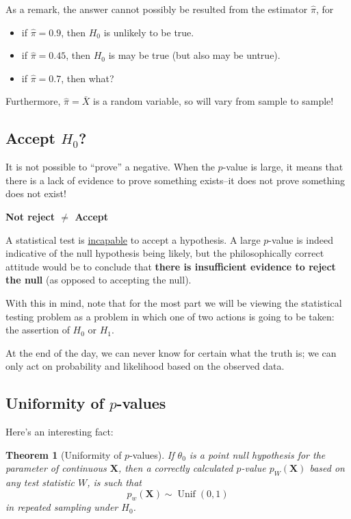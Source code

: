 \documentclass[
]{book}
\providecommand{\tightlist}{%
  \setlength{\itemsep}{0pt}\setlength{\parskip}{0pt}}
\newcommand{\bX}{{\boldsymbol X}}
\DeclareMathOperator{\Unif}{Unif}
\newtheorem{theorem}{Theorem}[chapter]
\theoremstyle{definition}
\theoremstyle{definition}
\theoremstyle{definition}
\theoremstyle{definition}
\theoremstyle{remark}
\begin{document}
As a remark, the answer cannot possibly be resulted from the estimator \(\hat\pi\), for

\begin{itemize}
\tightlist
\item
  if \(\hat\pi=0.9\), then \(H_0\) is unlikely to be true.
\item
  if \(\hat\pi=0.45\), then \(H_0\) is may be true (but also may be untrue).
\item
  if \(\hat\pi=0.7\), then what?
\end{itemize}

Furthermore, \(\hat\pi=\bar X\) is a random variable, so will vary from sample to sample!

\hypertarget{accept-h_0}{%
\subsection{\texorpdfstring{Accept \(H_0\)?}{Accept H\_0?}}\label{accept-h_0}}

It is not possible to ``prove'' a negative. When the \(p\)-value is large, it means that there is a lack of evidence to prove something exists--it does not prove something does not exist!

\textbf{Not reject \(\neq\) Accept}

A statistical test is \underline{incapable} to accept a hypothesis. A large \(p\)-value is indeed indicative of the null hypothesis being likely, but the philosophically correct attitude would be to conclude that \textbf{there is insufficient evidence to reject the null} (as opposed to accepting the null).

With this in mind, note that for the most part we will be viewing the statistical testing problem as a problem in which one of two actions is going to be taken: the assertion of \(H_0\) or \(H_1\).

At the end of the day, we can never know for certain what the truth is; we can only act on probability and likelihood based on the observed data.

\hypertarget{uniformity-of-p-values}{%
\subsection{\texorpdfstring{Uniformity of \(p\)-values}{Uniformity of p-values}}\label{uniformity-of-p-values}}

Here's an interesting fact:

\begin{theorem}[Uniformity of \(p\)-values]
If \(\theta_0\) is a point null hypothesis for the parameter of continuous \(\bX\), then a correctly calculated \(p\)-value \(p_W(\bX)\) based on any test statistic \(W\), is such that
\[
p_w(\bX) \sim \Unif(0,1)
\]
in repeated sampling under \(H_0\).
\end{theorem}
\end{document}
